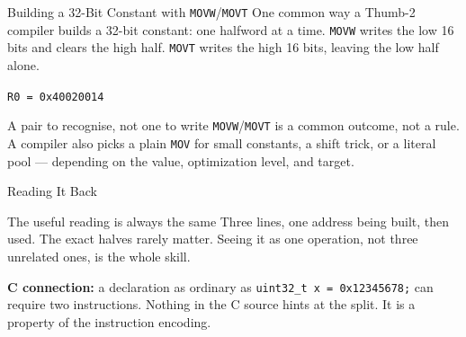 \documentclass[9pt,aspectratio=169,xcolor=table]{beamer}
\begin{document}
\begin{frame}[fragile]{Building a 32-Bit Constant with \texttt{MOVW}/\texttt{MOVT}}
    \leavevmode
    {\small One common way a Thumb-2 compiler builds a 32-bit constant:
    one halfword at a time. \texttt{MOVW} writes the low 16 bits and
    clears the high half. \texttt{MOVT} writes the high 16 bits, leaving
    the low half alone.}

    \vspace{2mm}
    \begin{center}
    \end{center}

    \vspace{2mm}
    \begin{center}
        \large\texttt{R0 = 0x40020014}
    \end{center}

    \vspace{2mm}
    \begin{block}{A pair to recognise, not one to write}
        {\small \texttt{MOVW}/\texttt{MOVT} is a \alert{common outcome},
        not a rule. A compiler also picks a plain \texttt{MOV} for small
        constants, a shift trick, or a literal pool --- depending on the
        value, optimization level, and target.}
    \end{block}
\end{frame}

\begin{frame}[fragile]{Reading It Back}
    \leavevmode
    \begin{center}
    \end{center}

    \vspace{3mm}
    \begin{block}{The useful reading is always the same}
        Three lines, \alert{one address being built, then used}. The exact
        halves rarely matter. Seeing it as one operation, not three
        unrelated ones, is the whole skill.
    \end{block}

    \vspace{3mm}
    {\small \textbf{C connection:} a declaration as ordinary as
    \texttt{uint32\_t x = 0x12345678;} can require two instructions.
    Nothing in the C source hints at the split. It is a property of the
    \alert{instruction encoding}.}
\end{frame}
\end{document}

